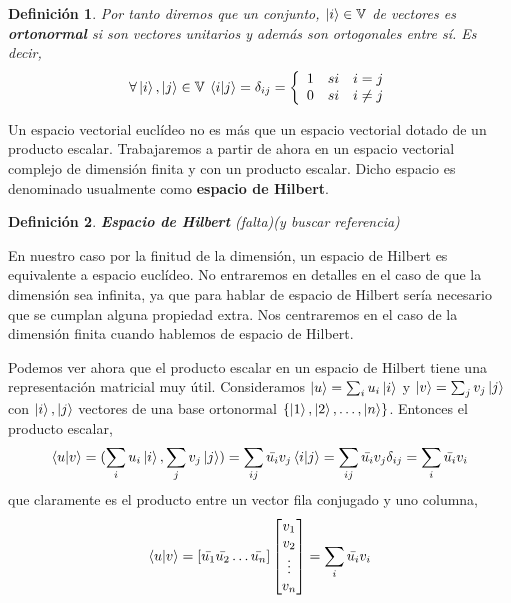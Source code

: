 \documentclass[a4paper]{article}
\newtheorem{deff}{Definición}[section]
\numberwithin{equation}{section}
\begin{document}
\begin{deff}Por tanto diremos que un conjunto, $\ket{i} \in \mathbb{V}$ de vectores es \textbf{ortonormal} si son vectores unitarios y además son ortogonales entre sí. Es decir,
\begin{equation}
\forall \ket{i},\ket{j} \in \mathbb{V} \:
\braket{i|j} = \delta_{ij} = \left\{ 
\begin{array}{lcc}
1 & si & i = j \\
0 & si & i \neq j
\end{array} \right.
\end{equation}
\end{deff}

Un espacio vectorial euclídeo no es más que un espacio vectorial dotado de un producto escalar. Trabajaremos a partir de ahora en un espacio vectorial complejo de dimensión finita y con un producto escalar. Dicho espacio es denominado usualmente como \textbf{espacio de Hilbert}.

\begin{deff}\textbf{Espacio de Hilbert}
(falta)(y buscar referencia)
\end{deff}

En nuestro caso por la finitud de la dimensión, un espacio de Hilbert es equivalente a espacio euclídeo.
No entraremos en detalles en el caso de que la dimensión sea infinita, ya que para hablar de espacio de Hilbert sería necesario que se cumplan alguna propiedad extra. Nos centraremos en el caso de la dimensión finita cuando hablemos de espacio de Hilbert.

Podemos ver ahora que el producto escalar en un espacio de Hilbert tiene una representación matricial muy útil.
Consideramos $\ket{u} = \sum_i u_i\ket{i}$ y $\ket{v} = \sum_j v_j\ket{j}$ con $\ket{i}, \ket{j}$ vectores de una base ortonormal $\{ \ket{1}, \ket{2}, \ldots, \ket{n} \}$.
Entonces el producto escalar,
\begin{equation}
\braket{u|v} = (\sum_i u_i\ket{i}, \sum_j v_j\ket{j}) = \sum_{ij} \bar{u_i} v_j\braket{i|j} = \sum_{ij} \bar{u_i} v_j\delta_{ij} = \sum_i \bar{u_i} v_i
\end{equation}
que claramente es el producto entre un vector fila conjugado y uno columna,
\begin{equation}
\braket{u|v} =
\left[ \bar{u_1}  \bar{u_2}  \ldots  \bar{u_n} \right]
\begin{bmatrix}
v_1 \\ v_2 \\ \vdots \\ v_n
\end{bmatrix} =
\sum_i \bar{u_i} v_i
\end{equation}
\end{document}
